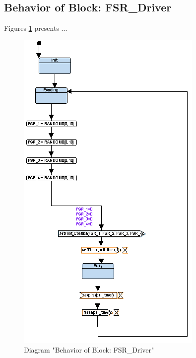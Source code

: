 \subsection{Behavior of Block: FSR\_Driver}
Figures \ref{fig:FSRDriverFSRDriver22} presents ...
\begin{figure}[htb]
\centering
\includegraphics[width=\textwidth]{img_2_2.png}
\caption{Diagram "Behavior of Block: FSR\_Driver"}
\label{fig:FSRDriverFSRDriver22}
\end{figure}

